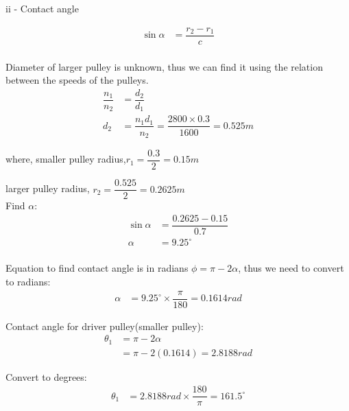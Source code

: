 \documentclass[a4paper, fleqn]{article}
\begin{document}
ii - Contact angle

\begin{equation*}
    \begin{aligned}
    \sin \alpha &= \dfrac{r_2 - r_1}{c}\\
    \end{aligned}
\end{equation*}

Diameter of larger pulley is unknown, thus we can find it using the relation between the speeds of the pulleys.
\begin{equation*}
    \begin{aligned}
    \dfrac{n_1}{n_2} &= \dfrac{d_2}{d_1}\\
    d_2 &= \dfrac{n_1 d_1}{n_2} = \dfrac{2800 \times 0.3}{1600} = 0.525 m
    \end{aligned}
\end{equation*}

where, smaller pulley radius,$r_1 = \dfrac{0.3}{2} = 0.15 m$
\vspace{10pt}

larger pulley radius, $r_2  = \dfrac{0.525}{2} = 0.2625 m$\\

Find $\alpha$:
\begin{equation*}
    \begin{aligned}
    \sin \alpha &= \dfrac{0.2625 - 0.15}{0.7}\\
    \alpha &= 9.25^{\circ}\\
    \end{aligned}
\end{equation*}

Equation to find contact angle is in radians $\phi = \pi - 2\alpha$, thus we need to
convert to radians:
\begin{equation*}
    \begin{aligned}
    \alpha &= 9.25^{\circ} \times \dfrac{\pi}{180} = 0.1614 rad
    \end{aligned}
\end{equation*}

Contact angle for driver pulley(smaller pulley):
\begin{equation*}
    \begin{aligned}
    \theta_1 &= \pi - 2\alpha\\
    &= \pi - 2(0.1614) = 2.8188 rad
    \end{aligned}
\end{equation*}

Convert to degrees:
\begin{equation*}
    \begin{aligned}
    \theta_1 &= 2.8188 rad \times \dfrac{180}{\pi} = 161.5^{\circ}
    \end{aligned}
\end{equation*}
\end{document}
